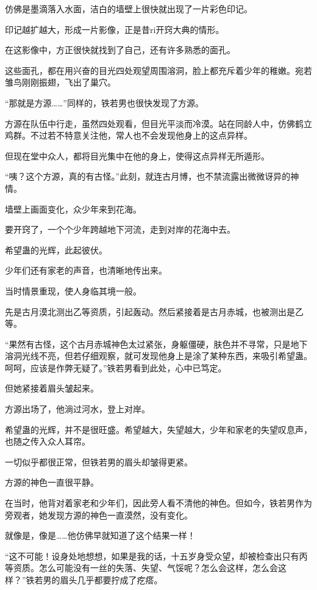 \begin{this_body}
仿佛是墨滴落入水面，洁白的墙壁上很快就出现了一片彩色印记。

印记越扩越大，形成一片影像，正是昔ri开窍大典的情形。

在这影像中，方正很快就找到了自己，还有许多熟悉的面孔。

这些面孔，都在用兴奋的目光四处观望周围溶洞，脸上都充斥着少年的稚嫩。宛若雏鸟刚刚振翅，飞出了巢穴。

“那就是方源……”同样的，铁若男也很快发现了方源。

方源在队伍中行走，虽然四处观看，但目光平淡而冷漠。站在同龄人中，仿佛鹤立鸡群。不过若不特意关注他，常人也不会发现他身上的这点异样。

但现在堂中众人，都将目光集中在他的身上，使得这点异样无所遁形。

“咦？这个方源，真的有古怪。”此刻，就连古月博，也不禁流露出微微讶异的神情。

墙壁上画面变化，众少年来到花海。

要开窍了，一个个少年跨越地下河流，走到对岸的花海中去。

希望蛊的光辉，此起彼伏。

少年们还有家老的声音，也清晰地传出来。

当时情景重现，使人身临其境一般。

先是古月漠北测出乙等资质，引起轰动。然后紧接着是古月赤城，也被测出是乙等。

“果然有古怪，这个古月赤城神色太过紧张，身躯僵硬，肤色并不寻常，只是地下溶洞光线不亮，但若仔细观察，就可发现他身上是涂了某种东西，来吸引希望蛊。呵呵，应该是作弊无疑了。”铁若男看到此处，心中已笃定。

但她紧接着眉头皱起来。

方源出场了，他淌过河水，登上对岸。

希望蛊的光辉，并不是很旺盛。希望越大，失望越大，少年和家老的失望叹息声，也随之传入众人耳帘。

一切似乎都很正常，但铁若男的眉头却皱得更紧。

方源的神色一直很平静。

在当时，他背对着家老和少年们，因此旁人看不清他的神色。但如今，铁若男作为旁观者，她发现方源的神色一直漠然，没有变化。

就像是，像是……他仿佛早就知道了这个结果一样！

“这不可能！设身处地想想，如果是我的话，十五岁身受众望，却被检查出只有丙等资质。怎么可能没有一丝的失落、失望、气馁呢？怎么会这样，怎么会这样？”铁若男的眉头几乎都要拧成了疙瘩。


\end{this_body}
